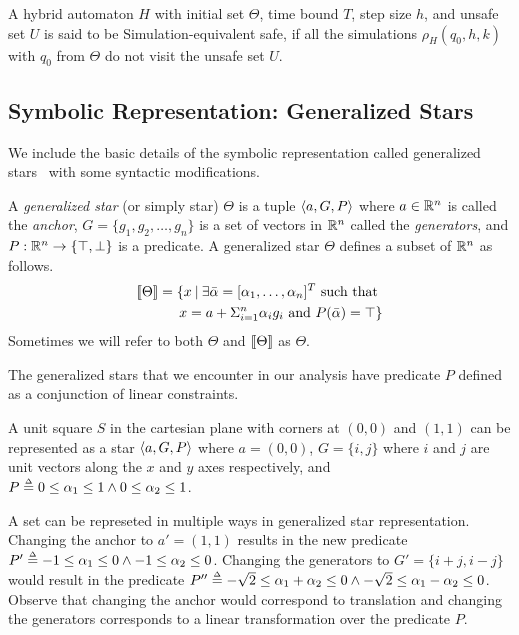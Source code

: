 \begin{definition}
\label{def:simSafe}
A hybrid automaton $H$ with initial set $\Theta$, time bound $T$, step size $h$, and unsafe set $U$ is said to be Simulation-equivalent safe, if all the simulations $\rho_{H}(q_0, h, k)$ with $q_0$ from $\Theta$ do not visit the unsafe set $U$.
\end{definition}

\subsection{Symbolic Representation: Generalized Stars}
\label{sec:genStars}
We include the basic details of the symbolic representation called generalized stars~\cite{duggirala2016parsimonious,bak2017tacas} with some syntactic modifications. 

\begin{definition}
\label{def:genStar}
A \emph{generalized star} (or simply star) $\Theta$ is a tuple $\tup{a,G,P}$ where $a \in \reals^n$ is called the \emph{anchor}, $G = \{g_1,g_2,\ldots, g_n\}$ is a set of vectors in $\reals^n$ called the \emph{generators}, and $P: \reals^n \rightarrow \{\top, \bot\}$ is a predicate. A generalized star $\Theta$ defines a subset of $\reals^n$ as follows.
\begin{eqnarray*}
[\![ \Theta ]\!] = \{ x\: |\: \exists \bar{\alpha} = [\alpha_1, \ldots, \alpha_n]^T \mbox{ such that }\\
 x = a + \Sigma_{i=1}^n \alpha_i g_i \mbox{ and } P(\bar{\alpha}) = \top \}
\end{eqnarray*}
Sometimes we will refer to both $\Theta$ and $[\![ \Theta ]\!]$ as $\Theta$.
\end{definition}
The generalized stars that we encounter in our analysis have predicate $P$ defined as a conjunction of linear constraints.

\begin{example}
\label{ex:genStar}
A unit square $S$ in the cartesian plane with corners at $(0,0)$ and $(1,1)$ can be represented as a star $\tup{a, G, P}$ where $a = (0,0)$, $G = \{i, j\}$ where $i$ and $j$ are unit vectors along the $x$ and $y$ axes respectively, and $P \mathrel{\stackrel{\scriptscriptstyle\Delta}{=}} 0 \leq \alpha_1 \leq 1 \wedge 0 \leq \alpha_2 \leq 1$.

A set can be represeted in multiple ways in generalized star representation. Changing the anchor to $a' = (1,1)$ results in the new predicate $P' \mathrel{\stackrel{\scriptscriptstyle\Delta}{=}} -1 \leq \alpha_1 \leq 0 \wedge -1 \leq \alpha_2 \leq 0$. Changing the generators to $G' = \{i+j, i-j\}$ would result in the predicate $P'' \mathrel{\stackrel{\scriptscriptstyle\Delta}{=}} -\sqrt{2} \leq \alpha_1 + \alpha_2 \leq 0 \wedge -\sqrt{2} \leq \alpha_1 - \alpha_2 \leq 0$. Observe that changing the anchor would correspond to translation and changing the generators corresponds to a linear transformation over the predicate $P$.
\end{example}

